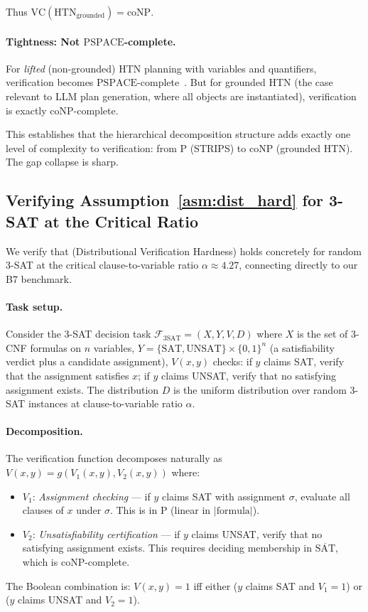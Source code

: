 \documentclass{article}
\theoremstyle{definition}
\theoremstyle{remark}
\newcommand{\PTIME}{\mathrm{P}}
\newcommand{\coNP}{\mathrm{coNP}}
\newcommand{\PSPACE}{\mathrm{PSPACE}}
\newcommand{\VC}{\mathrm{VC}}           %
\newcommand{\calF}{\mathcal{F}}         %
\begin{document}
Thus $\VC(\text{HTN}_{\text{grounded}}) = \coNP$.

\paragraph{Tightness: Not $\PSPACE$-complete.}

For \emph{lifted} (non-grounded) HTN planning with variables and quantifiers, verification becomes $\PSPACE$-complete~\citep{behnke2025lifted}. But for grounded HTN (the case relevant to LLM plan generation, where all objects are instantiated), verification is exactly $\coNP$-complete.

This establishes that the hierarchical decomposition structure adds exactly one level of complexity to verification: from $\PTIME$ (STRIPS) to $\coNP$ (grounded HTN). The gap collapse is sharp.

\subsection{Verifying Assumption~\ref{asm:dist_hard} for 3-SAT at the Critical Ratio}
\label{app:assumption_3sat}

We verify that  (Distributional Verification Hardness) holds concretely for random 3-SAT at the critical clause-to-variable ratio $\alpha \approx 4.27$, connecting directly to our B7 benchmark.

\paragraph{Task setup.}
Consider the 3-SAT decision task $\calF_{\text{3SAT}} = (X, Y, V, D)$ where $X$ is the set of 3-CNF formulas on $n$ variables, $Y = \{\text{SAT}, \text{UNSAT}\} \times \{0,1\}^n$ (a satisfiability verdict plus a candidate assignment), $V(x, y)$ checks: if $y$ claims SAT, verify that the assignment satisfies $x$; if $y$ claims UNSAT, verify that no satisfying assignment exists. The distribution $D$ is the uniform distribution over random 3-SAT instances at clause-to-variable ratio $\alpha$.

\paragraph{Decomposition.}
The verification function decomposes naturally as $V(x,y) = g(V_1(x,y), V_2(x,y))$ where:
\begin{itemize}
    \item $V_1$: \emph{Assignment checking} --- if $y$ claims SAT with assignment $\sigma$, evaluate all clauses of $x$ under $\sigma$. This is in $\PTIME$ (linear in $|\text{formula}|$).
    \item $V_2$: \emph{Unsatisfiability certification} --- if $y$ claims UNSAT, verify that no satisfying assignment exists. This requires deciding membership in $\overline{\text{SAT}}$, which is $\coNP$-complete.
\end{itemize}
The Boolean combination is: $V(x,y) = 1$ iff either ($y$ claims SAT and $V_1 = 1$) or ($y$ claims UNSAT and $V_2 = 1$).
\end{document}
